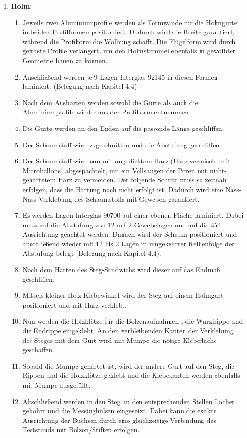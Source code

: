 \begin{enumerate}
	\item \textbf{Holm:}
	\begin{enumerate}
		\item Jeweils zwei Aluminiumprofile werden als Formwände für die Holmgurte in beiden Profilformen positioniert. Dadurch wird die Breite garantiert, während die Profilform die Wölbung schafft. Die Flügelform wird durch gefräste Profile verlängert, um den Holmstummel ebenfalls in gewölbter Geometrie bauen zu können. 
		\item Anschließend werden je 9 Lagen Interglas 92145 in diesen Formen laminiert. (Belegung nach Kapitel  4.4) 
		\item Nach dem Aushärten werden sowohl die Gurte als auch die Aluminiumprofile wieder aus der Profilform entnommen. 
		\item Die Gurte werden an den Enden auf die passende Länge geschliffen.
		\item Der Schaumstoff wird zugeschnitten und die Abstufung geschliffen.
		\item Der Schaumstoff wird nun mit angedicktem Harz (Harz vermischt mit Microballons) \glqq abgespachtelt\grqq, um ein Vollsaugen der Poren mit nicht-gehärtetem Harz zu vermeiden. Der folgende Schritt muss so zeitnah erfolgen, dass die Härtung noch nicht erfolgt ist. Dadurch wird eine Nass-Nass-Verklebung des Schaumstoffs mit Geweben garantiert.
		\item Es werden Lagen Interglas 90700 auf einer ebenen Fläche laminiert. Dabei muss auf die Abstufung von 12 auf 2 Gewebelagen und auf die 45°-Ausrichtung geachtet werden. Danach wird der Schaum positioniert und anschließend wieder mit 12 bis 2 Lagen in umgekehrter Reihenfolge der Abstufung belegt (Belegung nach Kapitel 4.4).
		\item Nach dem Härten des Steg-Sandwichs wird dieser auf das Endmaß geschliffen.
		\item Mittels kleiner Holz-Klebewinkel wird der Steg auf einem Holmgurt positioniert und mit Harz verklebt.
		\item Nun werden die Holzklötze für die Bolzenaufnahmen , die Wurzlrippe und die Endrippe eingeklebt. An den verbleibenden Kanten der Verklebung des Steges mit dem Gurt wird mit Mumpe die nötige Klebefläche geschaffen.
		\item Sobald die Mumpe gehärtet ist, wird der andere Gurt auf den Steg, die Rippen und die Holzklötze geklebt und die Klebekanten werden ebenfalls mit Mumpe ausgefüllt.
		\item Abschließend werden in den Steg an den entsprechenden Stellen Löcher gebohrt und die Messinghülsen eingesetzt. Dabei kann die exakte Ausrichtung der Buchsen durch eine gleichzeitige Verbindung des Teststands mit Bolzen/Stiften erfolgen.

\end{enumerate}
\end{enumerate}
